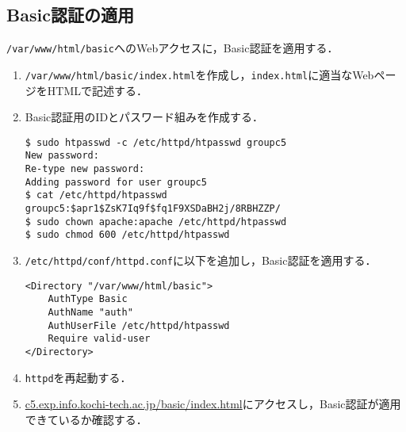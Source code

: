 \subsection{Basic認証の適用}
\texttt{/var/www/html/basic}へのWebアクセスに，Basic認証を適用する．
\begin{enumerate}
    \item \texttt{/var/www/html/basic/index.html}を作成し，\texttt{index.html}に適当なWebページをHTMLで記述する．
    \item Basic認証用のIDとパスワード組みを作成する．
          \begin{lstlisting}
$ sudo htpasswd -c /etc/httpd/htpasswd groupc5
New password: 
Re-type new password: 
Adding password for user groupc5
$ cat /etc/httpd/htpasswd 
groupc5:$apr1$ZsK7Iq9f$fq1F9XSDaBH2j/8RBHZZP/
$ sudo chown apache:apache /etc/httpd/htpasswd
$ sudo chmod 600 /etc/httpd/htpasswd        
    \end{lstlisting}
    \item \texttt{/etc/httpd/conf/httpd.conf}に以下を追加し，Basic認証を適用する．
          \begin{lstlisting}[style=file,caption={\ttfamily /etc/httpd/conf/httpd.conf}]
<Directory "/var/www/html/basic">
    AuthType Basic
    AuthName "auth"
    AuthUserFile /etc/httpd/htpasswd
    Require valid-user
</Directory>
\end{lstlisting}
    \item \texttt{httpd}を再起動する．
    \item \url{c5.exp.info.kochi-tech.ac.jp/basic/index.html}にアクセスし，Basic認証が適用できているか確認する．
\end{enumerate}